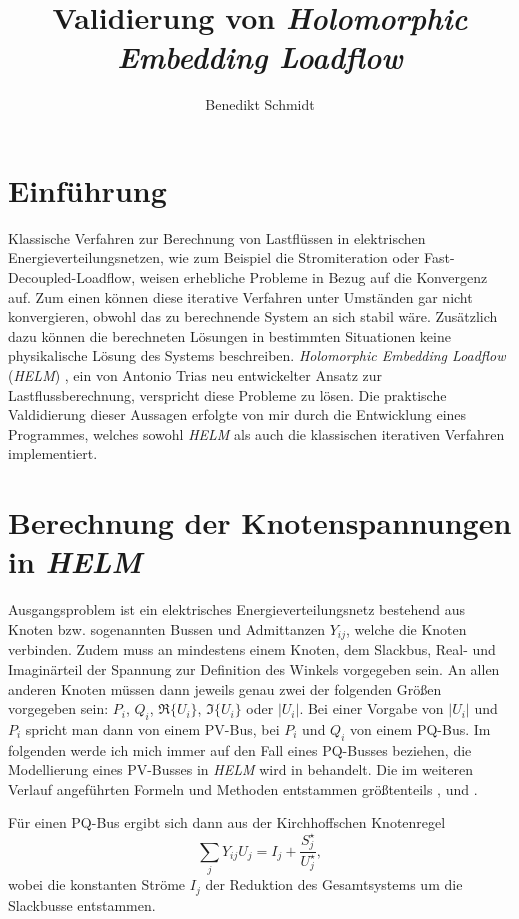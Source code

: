 \documentclass[12pt,a4paper]{article}
\author{Benedikt Schmidt}
\title{Validierung von \emph{Holomorphic Embedding Loadflow}}
\begin{document}
	\maketitle
	
	\section{Einführung}
	Klassische Verfahren zur Berechnung von Lastflüssen in elektrischen Energieverteilungsnetzen, wie zum Beispiel die Stromiteration oder Fast-Decoupled-Loadflow, weisen erhebliche Probleme in Bezug auf die Konvergenz auf. Zum einen können diese iterative Verfahren unter Umständen gar nicht konvergieren, obwohl das zu berechnende System an sich stabil wäre. Zusätzlich dazu können die berechneten Lösungen in bestimmten Situationen keine physikalische Lösung des Systems beschreiben. \emph{Holomorphic Embedding Loadflow} (\emph{HELM}) \cite{helmIEEE}, ein von Antonio Trias neu entwickelter Ansatz zur Lastflussberechnung, verspricht diese Probleme zu lösen. Die praktische Valdidierung dieser Aussagen erfolgte von mir durch die Entwicklung eines Programmes, welches sowohl \emph{HELM} als auch die klassischen iterativen Verfahren implementiert.
	
	\section{Berechnung der Knotenspannungen in \emph{HELM}}
	Ausgangsproblem ist ein elektrisches Energieverteilungsnetz bestehend aus Knoten bzw. sogenannten Bussen und Admittanzen $Y_{ij}$, welche die Knoten verbinden. Zudem muss an mindestens einem Knoten, dem Slackbus, Real- und Imaginärteil der Spannung zur Definition des Winkels vorgegeben sein. An allen anderen Knoten müssen dann jeweils genau zwei der folgenden Größen vorgegeben sein: $P_i$, $Q_i$, $\Re\{U_i\}$, $\Im\{U_i\}$ oder $|U_i|$. Bei einer Vorgabe von $|U_i|$ und $P_i$ spricht man dann von einem PV-Bus, bei $P_i$ und $Q_i$ von einem PQ-Bus. Im folgenden werde ich mich immer auf den Fall eines PQ-Busses beziehen, die Modellierung eines PV-Busses in \emph{HELM} wird in \cite{helmPV} behandelt. Die im weiteren Verlauf angeführten Formeln und Methoden entstammen größtenteils \cite{helmIEEE}, \cite{helmPatentApr2009} und \cite{helmPatentSept2009}.
	
	Für einen PQ-Bus ergibt sich dann aus der Kirchhoffschen Knotenregel
	\begin{equation}
		\sum_j Y_{ij} U_{j} = I_j + \frac{S_j^\star}{U_j^\star},
		\label{eq:loadflow}
	\end{equation}
	wobei die konstanten Ströme $I_j$ der Reduktion des Gesamtsystems um die Slackbusse entstammen.
	
\end{document}

